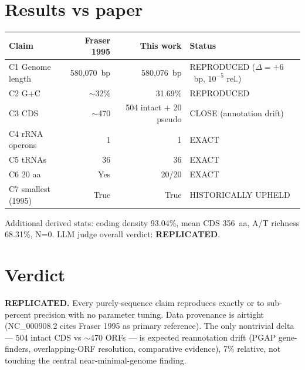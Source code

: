 \documentclass[11pt]{article}
\begin{document}
\section{Results vs paper}
\begin{longtable}{lrrl}
\toprule
Claim & Fraser 1995 & This work & Status \\
\midrule
C1 Genome length & 580{,}070~bp & 580{,}076~bp & REPRODUCED ($\Delta=+6$~bp, $10^{-5}$ rel.) \\
C2 G+C & $\sim$32\% & 31.69\% & REPRODUCED \\
C3 CDS & $\sim$470 & 504 intact + 20 pseudo & CLOSE (annotation drift) \\
C4 rRNA operons & 1 & 1 & EXACT \\
C5 tRNAs & 36 & 36 & EXACT \\
C6 20 aa & Yes & 20/20 & EXACT \\
C7 smallest (1995) & True & True & HISTORICALLY UPHELD \\
\bottomrule
\end{longtable}

\noindent Additional derived stats: coding density 93.04\%, mean CDS 356~aa,
A/T richness 68.31\%, N=0. LLM judge overall verdict: \textbf{REPLICATED}.

\section{Verdict}
\textbf{REPLICATED.} Every purely-sequence claim reproduces exactly or to sub-percent precision
with no parameter tuning. Data provenance is airtight (NC\_000908.2 cites Fraser 1995 as primary
reference). The only nontrivial delta --- 504 intact CDS vs $\sim$470 ORFs --- is expected
reannotation drift (PGAP gene-finders, overlapping-ORF resolution, comparative evidence), 7\%
relative, not touching the central near-minimal-genome finding.
\end{document}
